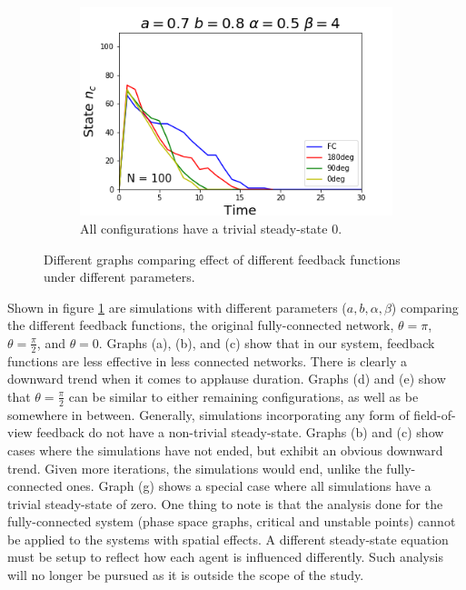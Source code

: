 \begin{figure}[h]
\begin{subfigure}[b]{0.4\linewidth}
    \includegraphics[width=\linewidth]{images/chapter4/feedback_sim7.png}
    \caption{All configurations have a trivial steady-state $0$.}
  \end{subfigure}
  \caption{Different graphs comparing effect of different feedback functions under different parameters.}
  \label{fig:spacesim}
\end{figure}

Shown in figure \ref{fig:spacesim} are simulations with different parameters ($a,b,\alpha,\beta$) comparing the different feedback functions, the original fully-connected network, $\theta = \pi$, $\theta = \frac{\pi}{2}$, and $\theta = 0$.
Graphs (a), (b), and (c) show that in our system, feedback functions are less effective in less connected networks. 
There is clearly a downward trend when it comes to applause duration.
Graphs (d) and (e) show that $\theta = \frac{\pi}{2}$ can be similar to either remaining configurations, as well as be somewhere in between.
Generally, simulations incorporating any form of field-of-view feedback do not have a non-trivial steady-state.
Graphs (b) and (c) show cases where the simulations have not ended, but exhibit an obvious downward trend.
Given more iterations, the simulations would end, unlike the fully-connected ones.
Graph (g) shows a special case where all simulations have a trivial steady-state of zero.
One thing to note is that the analysis done for the fully-connected system (phase space graphs, critical and unstable points) cannot be applied to the systems with spatial effects.
A different steady-state equation must be setup to reflect how each agent is influenced differently.
Such analysis will no longer be pursued as it is outside the scope of the study.

